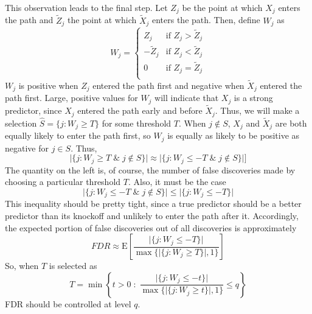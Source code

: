 \documentclass[11pt]{article}
\newcommand{\E}{\mathrm{E}}
\theoremstyle{definition}
\begin{document}
   This observation leads to the final step. Let $Z_j$ be the point at which $X_j$ enters the path and $\tilde Z_j$ the point at which $\tilde X_j$ enters the path. Then, define $W_j$ as 
   \[ W_j = \begin{cases}   Z_j         &\mbox{if } Z_j>\tilde Z_j \\ 
                            -\tilde Z_j &\mbox{if } Z_j<\tilde Z_j \\
                            0           &\mbox{if } Z_j=\tilde Z_j \\
            \end{cases} \]
            $W_j$ is positive when $Z_j$ entered the path first and negative when $\tilde X_j$ entered the path first. Large, positive values for $W_j$ will indicate that $X_j$ is a strong predictor, since $X_j$ entered the path early and before $\tilde X_j$. Thus, we will make a selection $\hat S=\{j:W_j\geq T\}$ for some threshold $T$. When $j\not\in S$, $X_j$ and $\tilde X_j$ are both equally likely to enter the path first, so $W_j$ is equally as likely to be positive as negative for $j\in S$. Thus, 
            \[ \vert\{j:W_j\geq T \; \& \; j\not\in S\}\vert \approx \vert\{j:W_j\leq -T \; \& \; j\not\in S\}\vert] \]
            The quantity on the left is, of course, the number of false discoveries made by choosing a particular threshold $T$. Also, it must be the case
            \[\vert \{j:W_j\leq -T \; \& \; j\not\in S\}\vert \leq \vert\{j:W_j\leq -T\}\vert\]
            This inequality should be pretty tight, since a true predictor should be a better predictor than its knockoff and unlikely to enter the path after it. Accordingly, the expected portion of false discoveries out of all discoveries is approximately
            \[FDR \approx \E\left[\frac{\vert\{j:W_j\leq -T\}\vert}{\max\{\vert\{j:W_j\geq T\}\vert,1\}}\right]\] 
            So, when $T$ is selected as
            \[ T = \min\left\{ t>0 \;: \; \frac{\vert\{j:W_j\leq -t\}\vert}{\max\{\vert\{j:W_j\geq t\}\vert,1\}}\leq q \right\} \] 
            FDR should be controlled at level $q$.
\end{document}
